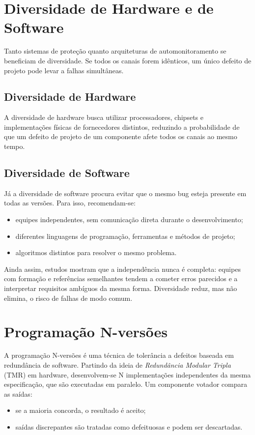 \documentclass[12pt,a4paper]{report}
\begin{document}
\section{Diversidade de Hardware e de Software}

Tanto sistemas de proteção quanto arquiteturas de automonitoramento se
beneficiam de diversidade. Se todos os canais forem idênticos, um único
defeito de projeto pode levar a falhas simultâneas.

\subsection{Diversidade de Hardware}

A diversidade de hardware busca utilizar processadores, chipsets e
implementações físicas de fornecedores distintos, reduzindo a probabilidade
de que um defeito de projeto de um componente afete todos os canais ao
mesmo tempo.

\subsection{Diversidade de Software}

Já a diversidade de software procura evitar que o mesmo bug esteja presente
em todas as versões. Para isso, recomendam-se:
\begin{itemize}[nosep]
    \item equipes independentes, sem comunicação direta durante o
    desenvolvimento;
    \item diferentes linguagens de programação, ferramentas e métodos de
    projeto;
    \item algoritmos distintos para resolver o mesmo problema.
\end{itemize}

Ainda assim, estudos mostram que a independência nunca é completa: equipes
com formação e referências semelhantes tendem a cometer erros parecidos e
a interpretar requisitos ambíguos da mesma forma. Diversidade reduz, mas
não elimina, o risco de falhas de modo comum.

\section{Programação N-versões}

A programação N-versões é uma técnica de tolerância a defeitos baseada em
redundância de software. Partindo da ideia de \emph{Redundância Modular
Tripla} (TMR) em hardware, desenvolvem-se N implementações independentes da
mesma especificação, que são executadas em paralelo. Um componente votador
compara as saídas:
\begin{itemize}[nosep]
    \item se a maioria concorda, o resultado é aceito;
    \item saídas discrepantes são tratadas como defeituosas e podem ser
    descartadas.
\end{itemize}
\end{document}
